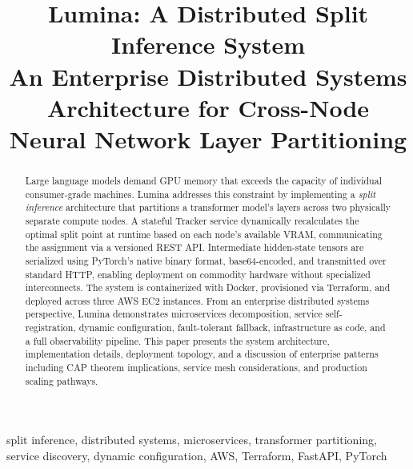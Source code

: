 \documentclass[conference]{IEEEtran}
\begin{document}
\title{Lumina: A Distributed Split Inference System\\
{\large An Enterprise Distributed Systems Architecture for Cross-Node Neural Network Layer Partitioning}}

\author{
}

\maketitle

\begin{abstract}
Large language models demand GPU memory that exceeds the capacity of individual
consumer-grade machines. Lumina addresses this constraint by implementing a
\emph{split inference} architecture that partitions a transformer model's layers
across two physically separate compute nodes. A stateful Tracker service
dynamically recalculates the optimal split point at runtime based on each
node's available VRAM, communicating the assignment via a versioned REST API.
Intermediate hidden-state tensors are serialized using PyTorch's native binary
format, base64-encoded, and transmitted over standard HTTP, enabling deployment
on commodity hardware without specialized interconnects. The system is
containerized with Docker, provisioned via Terraform, and deployed across three
AWS EC2 instances. From an enterprise distributed systems perspective, Lumina
demonstrates microservices decomposition, service self-registration, dynamic
configuration, fault-tolerant fallback, infrastructure as code, and a full
observability pipeline. This paper presents the system architecture,
implementation details, deployment topology, and a discussion of enterprise
patterns including CAP theorem implications, service mesh considerations, and
production scaling pathways.
\end{abstract}

\begin{IEEEkeywords}
split inference, distributed systems, microservices, transformer partitioning,
service discovery, dynamic configuration, AWS, Terraform, FastAPI, PyTorch
\end{IEEEkeywords}

\end{document}
